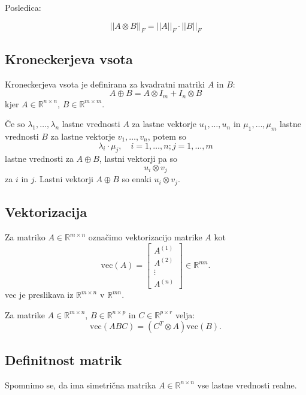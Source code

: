 \documentclass{article}
\begin{document}
\begin{multicols}{2}
Posledica:

\[
||A \otimes B||_F = ||A||_F \cdot ||B||_F
\]

\subsection{Kroneckerjeva vsota}

Kroneckerjeva vsota je definirana za kvadratni matriki \( A \) in \( B \):
\[ A \oplus B = A \otimes I_m + I_n \otimes B \]
kjer \( A \in \mathbb{R}^{n \times n} \), \( B \in \mathbb{R}^{m \times m} \).

\(\text{Če so } \lambda_1, \ldots, \lambda_n \) lastne vrednosti \( A \) za lastne vektorje \( u_1, \ldots, u_n \) in \( \mu_1, \ldots, \mu_m \) lastne vrednosti \( B \) za lastne vektorje \( v_1, \ldots, v_n \), potem so
\[ \lambda_i \cdot \mu_j, \quad i = 1, \ldots, n; j = 1, \ldots, m \]
lastne vrednosti za \( A \oplus B \), lastni vektorji pa so
\[ u_i \otimes v_j \]
za \( i \) in \( j \). Lastni vektorji \( A \oplus B \) so enaki \( u_i \otimes v_j \).


\subsection{Vektorizacija}

Za matriko \( A \in \mathbb{R}^{m \times n} \) označimo vektorizacijo matrike \( A \) kot
\[
\text{vec}(A) = \begin{bmatrix}
A^{(1)} \\
A^{(2)} \\
\vdots \\
A^{(n)}
\end{bmatrix} \in \mathbb{R}^{mn}.
\]
vec je preslikava iz \( \mathbb{R}^{m \times n} \) v \( \mathbb{R}^{mn} \).

Za matrike \( A \in \mathbb{R}^{m \times n} \), \( B \in \mathbb{R}^{n \times p} \) in \( C \in \mathbb{R}^{p \times r} \) velja:
\[
\text{vec}(ABC) = (C^T \otimes A)\text{vec}(B).
\]

\subsection{Definitnost matrik}

Spomnimo se, da ima simetrična matrika \( A \in \mathbb{R}^{n \times n} \) vse lastne vrednosti realne.


\end{multicols}
\end{document}
